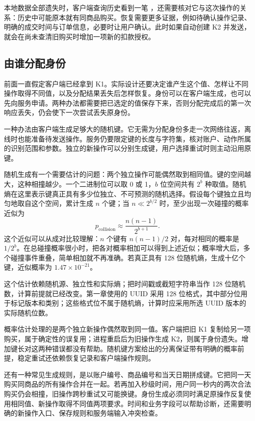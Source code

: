 本地数据全部遗失时，客户端查询历史看到一笔 ，还需要核对它与这次操作的关系：历史中可能原本就有同商品购买。恢复需要更多证据，例如待确认操作记录、明确的成交时间与订单信息，必要时让用户确认。此时如果自动创建 K2 并发送，就会在尚未查清旧购买时增加一项新的扣款授权。

\subsection*{由谁分配身份}

前面一直假定客户端已经拿到 K1。实际设计还要决定谁产生这个值、怎样让不同操作取得不同值，以及分配结果丢失后怎样恢复。身份可以在客户端生成，也可以先向服务申请。两种办法都需要把已选定的值保存下来，否则分配完成后的第一次响应丢失，仍会使下一次尝试丢失原身份。

一种办法由客户端生成足够大的随机键。它无需为分配身份多走一次网络往返，离线时也能准备待发送操作。服务仍要限定键的长度与字符集，核对账户、动作所属的识别范围和参数。独立的新操作可以分别生成键，用户选择重试时则主动沿用原键。

随机生成有一个需要估计的问题：两个独立操作可能偶然取到相同值。键的空间越大，这种相撞越少。一个二进制位可以取 0 或 1，\(b\) 位空间共有 \(2^b\) 种取值。随机熵在这里表示键真正具有多少位独立、不可预测的随机选择。假设每个键独立且均匀地取自这个空间，累计生成 \(n\) 个键；当 \(n\ll 2^{b/2}\) 时，至少出现一次碰撞的概率近似为
\[
 p_{\mathrm{collision}}\approx\frac{n(n-1)}{2^{b+1}}.
\]
这个近似可以从成对比较理解：\(n\) 个键有 \(n(n-1)/2\) 对，每对相同的概率是 \(1/2^b\)。在总碰撞概率很小时，把各对概率相加可以得到上述近似；概率增大后，多个碰撞事件重叠，简单相加就不再准确。若真正具有 128 位随机熵，生成十亿个键，近似概率为 \(1.47\times10^{-21}\)。

这个估计依赖随机源、独立性和实际熵；把时间戳或截短字符串当作 128 位随机数，计算前提就已经改变。第一章使用的 UUID 采用 128 位格式，其中部分位用于标记版本和类别；这些格式位不属于随机熵，计算时应采用所选 UUID 版本的实际随机位数。

概率估计处理的是两个独立新操作偶然取到同一值。客户端把旧 K1 复制给另一项购买，属于确定性的误复用；进程重启后为旧操作生成 K2，则属于身份遗失。增加键长对这两种错误都没有帮助。随机键方案给出的分离保证带有明确的概率前提，稳定重试还依赖恢复记录和客户端操作规则。

还有一种常见生成规则，是以账户编号、商品编号和当天日期拼成键。它把同一天购买同商品的所有操作合并在一起。若再加入秒级时间，用户同一秒内的两次合法购买仍会相撞，旧操作跨秒重试又可能换键。身份生成必须同时满足原操作反复使用相同值、新操作取得不同值两项要求。时间和业务字段可以帮助诊断，还需要明确的新操作入口、保存规则和服务端输入冲突检查。


